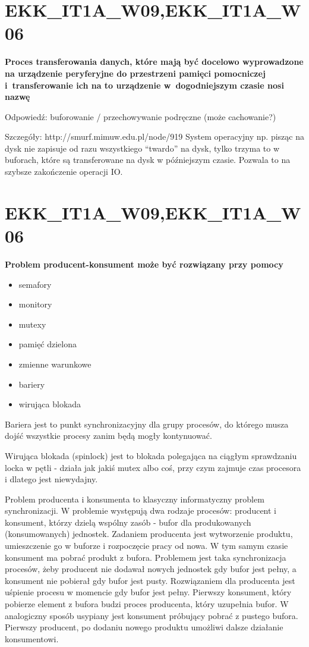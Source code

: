 \section{EKK\_IT1A\_W09,EKK\_IT1A\_W06}
\textbf{Proces transferowania danych, które mają być docelowo wyprowadzone na urządzenie peryferyjne do przestrzeni pamięci pomocniczej i~transferowanie ich na to urządzenie w~dogodniejszym czasie nosi nazwę}

\vspace{0.4cm}

Odpowiedź: buforowanie / przechowywanie podręczne (może cachowanie?)

Szczegóły: http://smurf.mimuw.edu.pl/node/919
System operacyjny np. pisząc na dysk nie zapisuje od razu wszystkiego “twardo” na dysk, tylko trzyma to w buforach, które są transferowane na dysk w późniejszym czasie. Pozwala to na szybsze zakończenie operacji IO.

\section{EKK\_IT1A\_W09,EKK\_IT1A\_W06}
\textbf{Problem producent-konsument może być rozwiązany przy pomocy}

\vspace{0.4cm}
\begin{itemize}
	\item semafory
	\item monitory
	\item mutexy
	\item pamięć dzielona
	\item zmienne warunkowe
	\item bariery
	\item wirująca blokada
\end{itemize}

Bariera jest to punkt synchronizacyjny dla grupy procesów, do którego musza dojść wszystkie procesy zanim będą mogły kontynuować.

Wirująca blokada (spinlock) jest to blokada polegająca na ciągłym sprawdzaniu locka w pętli - działa jak jakiś mutex albo coś, przy czym zajmuje czas procesora i dlatego jest niewydajny.

Problem producenta i konsumenta to klasyczny informatyczny problem synchronizacji. W problemie występują dwa rodzaje procesów: producent i konsument, którzy dzielą wspólny zasób - bufor dla produkowanych (konsumowanych) jednostek. Zadaniem producenta jest wytworzenie produktu, umieszczenie go w buforze i rozpoczęcie pracy od nowa. W tym samym czasie konsument ma pobrać produkt z bufora. Problemem jest taka synchronizacja procesów, żeby producent nie dodawał nowych jednostek gdy bufor jest pełny, a konsument nie pobierał gdy bufor jest pusty.
Rozwiązaniem dla producenta jest uśpienie procesu w momencie gdy bufor jest pełny. Pierwszy konsument, który pobierze element z bufora budzi proces producenta, który uzupełnia bufor. W analogiczny sposób usypiany jest konsument próbujący pobrać z pustego bufora. Pierwszy producent, po dodaniu nowego produktu umożliwi dalsze działanie konsumentowi. 


